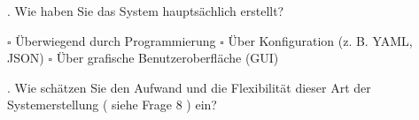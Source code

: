 \documentclass{article}
\begin{document}
\noindent
{}

. Wie haben Sie das System hauptsächlich erstellt?
\begin{flushleft}
    $\square$ Überwiegend durch Programmierung \quad
    $\square$ Über Konfiguration (z. B. YAML, JSON) \quad
    $\square$ Über grafische Benutzeroberfläche (GUI) \quad
\end{flushleft}

. Wie schätzen Sie den Aufwand und die Flexibilität dieser Art der Systemerstellung
( siehe Frage 8 ) ein?
\end{document}
